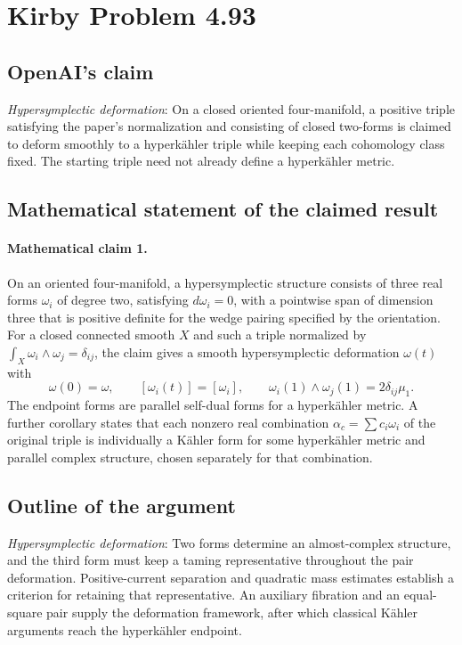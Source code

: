 \documentclass[11pt]{article}
\begin{document}
\section*{Kirby Problem 4.93}

\subsection{OpenAI's claim}
\textit{Hypersymplectic deformation}: On a closed oriented four-manifold, a positive triple satisfying the paper’s normalization and consisting of closed two-forms is claimed to deform smoothly to a hyperkähler triple while keeping each cohomology class fixed. The starting triple need not already define a hyperkähler metric.

\subsection{Mathematical statement of the claimed result}
\paragraph{Mathematical claim 1.} On an oriented four-manifold, a hypersymplectic structure consists of three real forms $\omega_i$ of degree two, satisfying $d\omega_i=0$, with a pointwise span of dimension three that is positive definite for the wedge pairing specified by the orientation. For a closed connected smooth $X$ and such a triple normalized by $\int_X\omega_i\wedge\omega_j=\delta_{ij}$, the claim gives a smooth hypersymplectic deformation $\omega(t)$ with \[\omega(0)=\omega,\qquad[\omega_i(t)]=[\omega_i],\qquad\omega_i(1)\wedge\omega_j(1)=2\delta_{ij}\mu_1.\] The endpoint forms are parallel self-dual forms for a hyperk\"ahler metric. A further corollary states that each nonzero real combination $\alpha_c=\sum c_i\omega_i$ of the original triple is individually a K\"ahler form for some hyperk\"ahler metric and parallel complex structure, chosen separately for that combination.

\subsection{Outline of the argument}
\textit{Hypersymplectic deformation}: Two forms determine an almost-complex structure, and the third form must keep a taming representative throughout the pair deformation. Positive-current separation and quadratic mass estimates establish a criterion for retaining that representative. An auxiliary fibration and an equal-square pair supply the deformation framework, after which classical Kähler arguments reach the hyperkähler endpoint.
\end{document}
